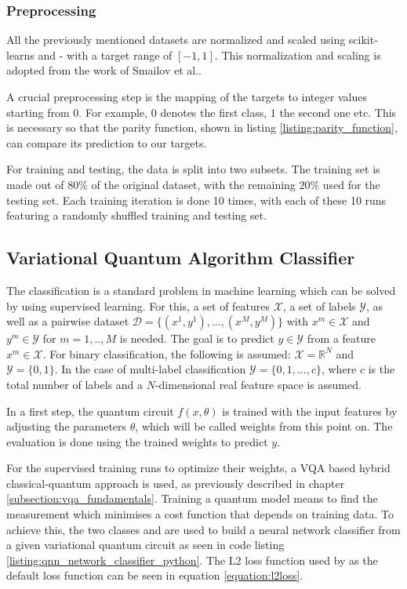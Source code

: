 \subsubsection{Preprocessing}
All the previously mentioned datasets are normalized and scaled using scikit-learns\cite{scikit-learn}  and  - with a target range of $[-1, 1]$. This normalization and scaling is adopted from the work of Smailov et al.\cite{smailovQuantumMachineLearning2021}.\par
A crucial preprocessing step is the mapping of the targets to integer values starting from $0$. For example, $0$ denotes the first class, $1$ the second one etc. This is necessary so that the parity function, shown in listing \ref{listing:parity_function}, can compare its prediction to our targets. \par
For training and testing, the data is split into two subsets. The training set is made out of $80$\% of the original dataset, with the remaining $20$\% used for the testing set. Each training iteration is done 10 times, with each of these 10 runs featuring a randomly shuffled training and testing set.

\subsection{Variational Quantum Algorithm Classifier} 
The classification is a standard problem in machine learning which can be solved by using supervised learning. For this, a set of features $\mathcal{X}$, a set of labels $\mathcal{Y}$, as well as a pairwise dataset $\mathcal{D} = \{(x^1,y^1),...,(x^M,y^M)\}$ with $x^m \in \mathcal{X}$ and $y^m \in \mathcal{Y}$ for $m= 1,..,M$ is needed. The goal is to predict $y \in \mathcal{Y}$ from a feature $x^m \in \mathcal{X}$. For binary classification, the following is assumed: $\mathcal{X} = \mathbb{R}^N$ and $\mathcal{Y} = \{0,1\}$. In the case of multi-label classification $\mathcal{Y} = \{0,1,...,c\}$, where $c$ is the total number of labels and a $N$-dimensional real feature space is assumed.\par
In a first step, the quantum circuit $f(x,\theta)$ is trained with the input features by adjusting the parameters $\theta$, which will be called weights from this point on. The evaluation is done using the trained weights to predict $y$.\par
For the supervised training runs to optimize their weights, a VQA based hybrid classical-quantum approach is used, as previously described in chapter \ref{subsection:vqa_fundamentals}. Training a quantum model means to find the measurement which minimises a cost function that depends on training data. To achieve this,  the two \cite{Qiskit} classes  and  are used to build a neural network classifier from a given variational quantum circuit as seen in code listing \ref{listing:qnn_network_classifier_python}. The  L2 loss function used by  as the default loss function can be seen in equation \ref{equation:l2loss}.

